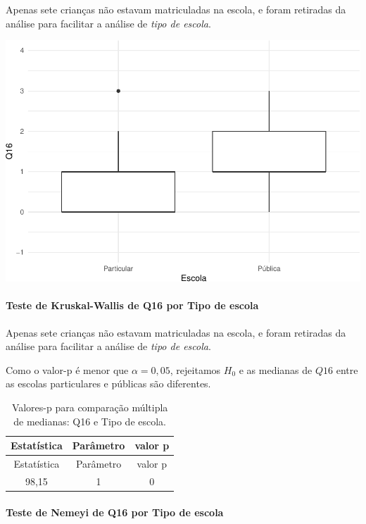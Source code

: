 \documentclass[]{article}
\let\oldparagraph\paragraph
\renewcommand{\paragraph}[1]{\oldparagraph{#1}\mbox{}}
\begin{document}
Apenas sete crianças não estavam matriculadas na escola, e foram retiradas da análise para facilitar a análise de \emph{tipo de escola}.

\begin{center}\includegraphics[width=0.75\linewidth]{relatorio_files/figure-latex/unnamed-chunk-175-1} \end{center}

\hypertarget{teste-de-kruskal-wallis-de-q16-por-tipo-de-escola}{%
\paragraph{Teste de Kruskal-Wallis de Q16 por Tipo de escola}\label{teste-de-kruskal-wallis-de-q16-por-tipo-de-escola}}

Apenas sete crianças não estavam matriculadas na escola, e foram retiradas da análise para facilitar a análise de \emph{tipo de escola}.

Como o valor-p é menor que \(\alpha=0,05\), rejeitamos \(H_0\) e as medianas de \(Q16\) entre as escolas particulares e públicas são diferentes.

\begin{longtable}[]{@{}ccc@{}}
\caption{\label{tab:unnamed-chunk-176}Valores-p para comparação múltipla de medianas: Q16 e Tipo de escola.}\tabularnewline
\toprule
Estatística & Parâmetro & valor p\tabularnewline
\midrule
\endfirsthead
\toprule
Estatística & Parâmetro & valor p\tabularnewline
\midrule
\endhead
98,15 & 1 & 0\tabularnewline
\bottomrule
\end{longtable}

\hypertarget{teste-de-nemeyi-de-q16-por-tipo-de-escola}{%
\paragraph{Teste de Nemeyi de Q16 por Tipo de escola}\label{teste-de-nemeyi-de-q16-por-tipo-de-escola}}
\end{document}
